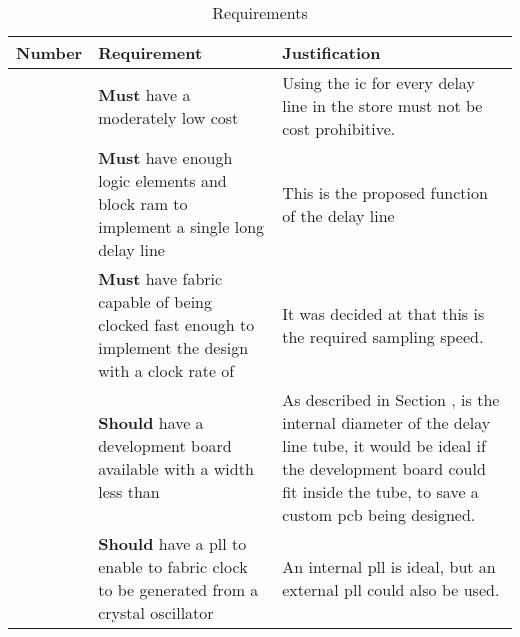 \begin{table}[ht]

	
	\centering
	
	\caption{ Requirements}

	\label{tbl:fpga-reqs}
	\begin{tabular}{l p{} p{}}

		\toprule

		Number & Requirement & Justification \\

		
		\midrule

		{FpgaSpecNo}\theFpgaSpecNo\label{itm:fpga-spec-cost} &
		\textbf{Must} have a moderately low cost &
		Using the \gls{ic} for every delay line in the store must not be cost prohibitive.\\
		
		
		\midrule
		
		{FpgaSpecNo}\theFpgaSpecNo\label{itm:fpga-spec-les} &
		\textbf{Must} have enough logic elements and block \gls{ram} to implement a single long delay line &
		This is the proposed function of the delay line\\
		
		\midrule

		{FpgaSpecNo}\theFpgaSpecNo\label{itm:fpga-spec-speed} &
		\textbf{Must} have fabric capable of being clocked fast enough to implement the design with a clock rate of \review{xx} &
		It was decided at \review{xx} that this is the required sampling speed.\\
		
		\midrule

		{FpgaSpecNo}\theFpgaSpecNo\label{itm:fpga-spec-dev-board} &
		\textbf{Should} have a development board available with a width less than \review{xx} &
		As described in Section \review{xx}, \review{xx} is the internal diameter of the delay line tube, it would be ideal if the development board could fit inside the tube, to save a custom \gls{pcb} being designed.\\

		
		\midrule

		{FpgaSpecNo}\theFpgaSpecNo\label{itm:fpga-spec-pll} &
		\textbf{Should} have a \gls{pll} to enable to fabric clock to be generated from a crystal oscillator &
		An internal \gls{pll} is ideal, but an external \gls{pll} could also be used.\\
		
		\bottomrule

	\end{tabular}

\end{table}

